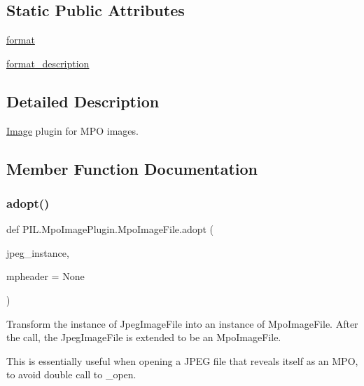 \subsection*{Static Public Attributes}
\begin{DoxyCompactItemize}
\item 
\hyperlink{classPIL_1_1MpoImagePlugin_1_1MpoImageFile_a6427d5e203a18d7b0c6dee7bde697be1}{format}
\item 
\hyperlink{classPIL_1_1MpoImagePlugin_1_1MpoImageFile_a51bf53b5fa7fbecd09872cec13a78d8a}{format\+\_\+description}
\end{DoxyCompactItemize}


\subsection{Detailed Description}
\hyperlink{namespacePIL_1_1Image}{Image} plugin for M\+PO images. 



\subsection{Member Function Documentation}
\mbox{\label{classPIL_1_1MpoImagePlugin_1_1MpoImageFile_afec10ba2729372cd1d18c060638d4976}} 
\subsubsection{\texorpdfstring{adopt()}{adopt()}}
{\footnotesize\ttfamily def P\+I\+L.\+Mpo\+Image\+Plugin.\+Mpo\+Image\+File.\+adopt (\begin{DoxyParamCaption}\item[{}]{jpeg\+\_\+instance,  }\item[{}]{mpheader = {\ttfamily None} }\end{DoxyParamCaption})\hspace{0.3cm}{\ttfamily [static]}}

\begin{DoxyVerb}Transform the instance of JpegImageFile into
an instance of MpoImageFile.
After the call, the JpegImageFile is extended
to be an MpoImageFile.

This is essentially useful when opening a JPEG
file that reveals itself as an MPO, to avoid
double call to _open.
\end{DoxyVerb}
 \mbox{\label{classPIL_1_1MpoImagePlugin_1_1MpoImageFile_a7e9393518b5181715b6182674e10b783}} 
